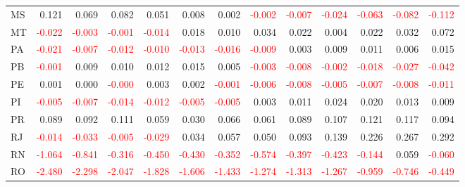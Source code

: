 \begin{table}[!htb]
{\begin{tabular}{lrrrrrrrrrrrr}
      MS & 0.121 & 0.069 & 0.082 & 0.051 & 0.008 & 0.002 & \textcolor{red}{-0.002} & \textcolor{red}{-0.007} & \textcolor{red}{-0.024} & \textcolor{red}{-0.063} & \textcolor{red}{-0.082} & \textcolor{red}{-0.112} \\
      MT & \textcolor{red}{-0.022} & \textcolor{red}{-0.003} & \textcolor{red}{-0.001} & \textcolor{red}{-0.014} & 0.018 & 0.010 & 0.034 & 0.022 & 0.004 & 0.022 & 0.032 & 0.072 \\
      PA & \textcolor{red}{-0.021} & \textcolor{red}{-0.007} & \textcolor{red}{-0.012} & \textcolor{red}{-0.010} & \textcolor{red}{-0.013} & \textcolor{red}{-0.016} & \textcolor{red}{-0.009} & 0.003 & 0.009 & 0.011 & 0.006 & 0.015 \\
      PB & \textcolor{red}{-0.001} & 0.009 & 0.010 & 0.012 & 0.015 & 0.005 & \textcolor{red}{-0.003} & \textcolor{red}{-0.008} & \textcolor{red}{-0.002} & \textcolor{red}{-0.018} & \textcolor{red}{-0.027} & \textcolor{red}{-0.042} \\
      PE & 0.001 & 0.000 & \textcolor{red}{-0.000} & 0.003 & 0.002 & \textcolor{red}{-0.001} & \textcolor{red}{-0.006} & \textcolor{red}{-0.008} & \textcolor{red}{-0.005} & \textcolor{red}{-0.007} & \textcolor{red}{-0.008} & \textcolor{red}{-0.011} \\
      PI & \textcolor{red}{-0.005} & \textcolor{red}{-0.007} & \textcolor{red}{-0.014} & \textcolor{red}{-0.012} & \textcolor{red}{-0.005} & \textcolor{red}{-0.005} & 0.003 & 0.011 & 0.024 & 0.020 & 0.013 & 0.009 \\
      PR & 0.089 & 0.092 & 0.111 & 0.059 & 0.030 & 0.066 & 0.061 & 0.089 & 0.107 & 0.121 & 0.117 & 0.094 \\
      RJ & \textcolor{red}{-0.014} & \textcolor{red}{-0.033} & \textcolor{red}{-0.005} & \textcolor{red}{-0.029} & 0.034 & 0.057 & 0.050 & 0.093 & 0.139 & 0.226 & 0.267 & 0.292 \\
      RN & \textcolor{red}{-1.064} & \textcolor{red}{-0.841} & \textcolor{red}{-0.316} & \textcolor{red}{-0.450} & \textcolor{red}{-0.430} & \textcolor{red}{-0.352} & \textcolor{red}{-0.574} & \textcolor{red}{-0.397} & \textcolor{red}{-0.423} & \textcolor{red}{-0.144} & 0.059 & \textcolor{red}{-0.060} \\
      RO & \textcolor{red}{-2.480} & \textcolor{red}{-2.298} & \textcolor{red}{-2.047} & \textcolor{red}{-1.828} & \textcolor{red}{-1.606} & \textcolor{red}{-1.433} & \textcolor{red}{-1.274} & \textcolor{red}{-1.313} & \textcolor{red}{-1.267} & \textcolor{red}{-0.959} & \textcolor{red}{-0.746} & \textcolor{red}{-0.449} \\

\end{tabular}}
\end{table}
